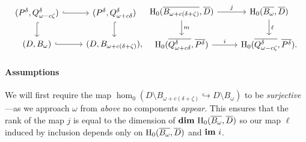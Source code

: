 

\begin{equation}\label{dgm:1}
\begin{tikzcd}
  (P^\of, \Q^\of) \arrow[hookrightarrow]{r}\arrow[hookrightarrow]{d} &
  (P^\of, \QQ^\of) \arrow[hookrightarrow]{d} \\
  (D, \bb) \arrow[hookrightarrow]{r} &
  (D, B_{\omega+c(\delta+\zeta)}),
\end{tikzcd}
\begin{tikzcd}
  \hom_0(\cmp{B_{\omega+c(\delta+\zeta)}},\cmp{D})\arrow{d}{m} \arrow{r}{j} &
  \hom_0(\cmp{\bb}, \cmp{D}) \arrow{d}{\ell} \\
  \hom_0(\cmp{\QQ^\of}, \cmp{P^\of}) \arrow{r}{i} &
  \hom_0(\cmp{\Q^\of}, \cmp{P^\of}).
\end{tikzcd}\end{equation}

\paragraph*{Assumptions}

We will first require the map $\hom_0(D\setminus B_{\omega+c(\delta+\zeta)}\hookrightarrow D\setminus B_\omega)$ to be \emph{surjective}---as we approach $\omega$ from \emph{above} no components \emph{appear}.
This ensures that the rank of the map $j$ is equal to the dimension of $\mathbf{dim}~\mathrm{H}_0(\overline{B_\omega}, \overline{D})$ so our map $\ell$ induced by inclusion depends only on $\mathrm{H}_0(\overline{B_\omega}, \overline{D})$ and $\mathbf{im}~i$.

